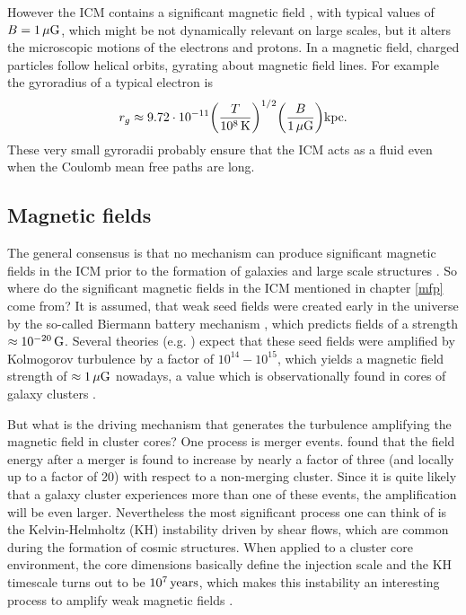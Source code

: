 However the ICM contains a significant magnetic field \citep{Plionis2008}, with
typical values of $B=\unit[1]{\mu G}$, which might be not dynamically relevant
on large scales, but it alters the microscopic motions of the electrons and
protons. In a magnetic field, charged particles follow helical orbits, gyrating
about magnetic field lines. For example the gyroradius of a typical electron is 
\begin{align}
r_g \approx 9.72 \cdot 10^{-11} 
\lra{\frac{T}{\unit[10^8]{K}}}^{1/2} 
\lra{\frac{B}{\unit[1]{\mu G}}} \unit{kpc}. 
\end{align}
These very small gyroradii probably ensure that the ICM acts as a fluid even
when the Coulomb mean free paths are long. 

\subsection{Magnetic fields}
The general consensus is that no mechanism can produce significant magnetic
fields in the ICM prior to the formation of galaxies and large scale structures
\citep{Kulsrud2008}. So where do the significant magnetic fields in the ICM
mentioned in chapter \ref{mfp} come from? It is assumed, that weak seed fields
were created early in the universe by the so-called Biermann battery mechanism
\citep{Biermann1951}, which predicts fields of a strength $\approx
\unit[10^{-20}]{G}$. Several theories (e.g. \citet{Kulsrud1992})
expect that these seed fields were amplified by Kolmogorov turbulence by a
factor of $10^{14}-10^{15}$, which yields a magnetic field strength of 
$\approx \unit[1]{\mu G}$ nowadays, a value which is observationally found in
cores of galaxy clusters \citep{Carilli2002}. 

But what is the driving mechanism that generates the turbulence amplifying
the magnetic field in cluster cores? One process is merger events. 
\citet{Roettiger1999}
found that the field energy after a merger is found to increase by nearly a
factor of three (and locally up to a factor of 20) with respect to a non-merging
cluster. Since it is quite likely that a galaxy cluster experiences more than
one of these events, the amplification will be even larger. Nevertheless the
most significant process one can think of is the Kelvin-Helmholtz (KH)
instability driven by shear flows, which are common during the formation of
cosmic structures. When applied to a cluster core environment, the core
dimensions basically define 
the injection scale and the KH timescale turns out to be $\unit[10^7]{years}$,
which makes this instability an interesting process to amplify weak magnetic
fields \citep{Dolag2008}. 

